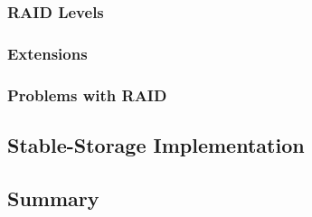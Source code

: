\subsubsection{RAID Levels}
\subsubsection{Extensions}
\subsubsection{Problems with RAID}
\subsection{Stable-Storage Implementation}
\subsection{Summary}

